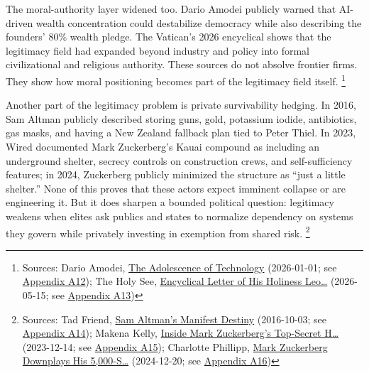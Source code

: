 \documentclass[
  american,
  11pt,
  letterpaper,
]{article}
\begin{document}
The moral-authority layer widened too. Dario Amodei publicly warned that
AI-driven wealth concentration could destabilize democracy while also
describing the founders' 80\% wealth pledge. The Vatican's 2026
encyclical shows that the legitimacy field had expanded beyond industry
and policy into formal civilizational and religious authority. These
sources do not absolve frontier firms. They show how moral positioning
becomes part of the legitimacy field itself. \footnote{Sources: Dario
  Amodei,
  \href{https://darioamodei.com/essay/the-adolescence-of-technology}{The
  Adolescence of Technology} (2026-01-01; see
  \hyperref[ch-08-appendix-a12-the-adolescence-of-technology]{Appendix
  A12}); The Holy See,
  \href{https://www.vatican.va/content/leo-xiv/en/encyclicals/documents/20260515-magnifica-humanitas.html}{Encyclical
  Letter of His Holiness Leo\ldots{}} (2026-05-15; see
  \hyperref[ch-08-appendix-a13-encyclical-letter-of-his-holiness-leo-xiv-magnifica-humanitas]{Appendix
  A13})}

Another part of the legitimacy problem is private survivability hedging.
In 2016, Sam Altman publicly described storing guns, gold, potassium
iodide, antibiotics, gas masks, and having a New Zealand fallback plan
tied to Peter Thiel. In 2023, Wired documented Mark Zuckerberg's Kauai
compound as including an underground shelter, secrecy controls on
construction crews, and self-sufficiency features; in 2024, Zuckerberg
publicly minimized the structure as ``just a little shelter.'' None of
this proves that these actors expect imminent collapse or are
engineering it. But it does sharpen a bounded political question:
legitimacy weakens when elites ask publics and states to normalize
dependency on systems they govern while privately investing in exemption
from shared risk. \footnote{Sources: Tad Friend,
  \href{https://www.newyorker.com/magazine/2016/10/10/sam-altmans-manifest-destiny}{Sam
  Altman's Manifest Destiny} (2016-10-03; see
  \hyperref[ch-08-appendix-a14-sam-altman-s-manifest-destiny]{Appendix
  A14}); Makena Kelly,
  \href{https://www.wired.com/story/mark-zuckerberg-inside-hawaii-compound}{Inside
  Mark Zuckerberg's Top-Secret H\ldots{}} (2023-12-14; see
  \hyperref[ch-08-appendix-a15-inside-mark-zuckerbergs-top-secret-hawaii-compound]{Appendix
  A15}); Charlotte Phillipp,
  \href{https://people.com/mark-zuckerberg-hawaii-bunker-5000-square-feet-8765376}{Mark
  Zuckerberg Downplays His 5,000-S\ldots{}} (2024-12-20; see
  \hyperref[ch-08-appendix-a16-mark-zuckerberg-downplays-his-5-000-square-foot-underground-bunker-in-hawaii-just-a-little-shelter]{Appendix
  A16})}
\end{document}
